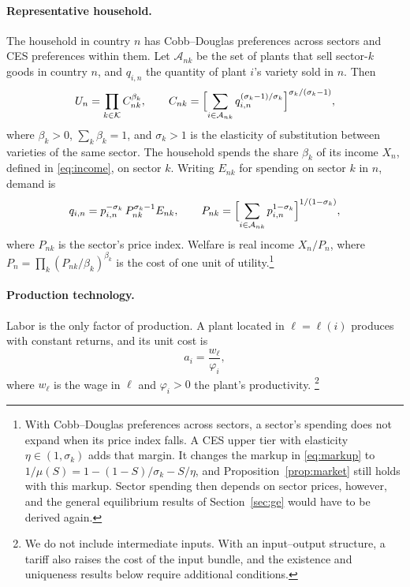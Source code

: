 \documentclass[11pt]{article}
\newcommand{\cK}{\mathcal K}
\newcommand{\cA}{\mathcal A}
\begin{document}
\paragraph{Representative household.} The household in country $n$ has
Cobb--Douglas preferences across sectors and CES preferences within them. Let
$\cA_{nk}$ be the set of plants that sell sector-$k$ goods in country $n$, and
$q_{i,n}$ the quantity of plant $i$'s variety sold in $n$. Then
\begin{equation}
  U_n=\prod_{k\in\cK}C_{nk}^{\beta_k},
  \qquad
  C_{nk}=\Bigl[\sum_{i\in\cA_{nk}}q_{i,n}^{(\sigma_k-1)/\sigma_k}\Bigr]^{\sigma_k/(\sigma_k-1)},
  \label{eq:utility}
\end{equation}
where $\beta_k>0$, $\sum_k\beta_k=1$, and $\sigma_k>1$ is the elasticity of
substitution between varieties of the same sector. The household spends the share
$\beta_k$ of its income $X_n$, defined in \eqref{eq:income}, on sector $k$. Writing
$E_{nk}$ for spending on sector $k$ in $n$, demand is
\begin{equation}
  q_{i,n}=p_{i,n}^{-\sigma_k}\,P_{nk}^{\sigma_k-1}E_{nk},
  \qquad
  P_{nk}=\Bigl[\sum_{i\in\cA_{nk}}p_{i,n}^{1-\sigma_k}\Bigr]^{1/(1-\sigma_k)} ,
  \label{eq:demand}
\end{equation}
where $P_{nk}$ is the sector's price index. Welfare is real income $X_n/P_n$, where
$P_n=\prod_k(P_{nk}/\beta_k)^{\beta_k}$ is the cost of one unit of
utility.\footnote{With Cobb--Douglas preferences across sectors, a sector's spending
does not expand when its price index falls. A CES upper tier with elasticity
$\eta\in(1,\sigma_k)$ adds that margin. It changes the markup in \eqref{eq:markup} to
$1/\mu(S)=1-(1-S)/\sigma_k-S/\eta$, and Proposition~\ref{prop:market} still holds
with this markup. Sector spending then depends on sector prices, however, and the
general equilibrium results of Section~\ref{sec:ge} would have to be derived again.}

\paragraph{Production technology.} Labor is the only factor of production. A plant
located in $\ell=\ell(i)$ produces with constant returns, and its unit cost is
\begin{equation}
  a_i=\frac{w_\ell}{\varphi_i},
  \label{eq:cost}
\end{equation}
where $w_\ell$ is the wage in $\ell$ and $\varphi_i>0$ the plant's productivity.%
\footnote{We do not include intermediate inputs. With an input--output structure, a
tariff also raises the cost of the input bundle, and the existence and uniqueness
results below require additional conditions.}
\end{document}
